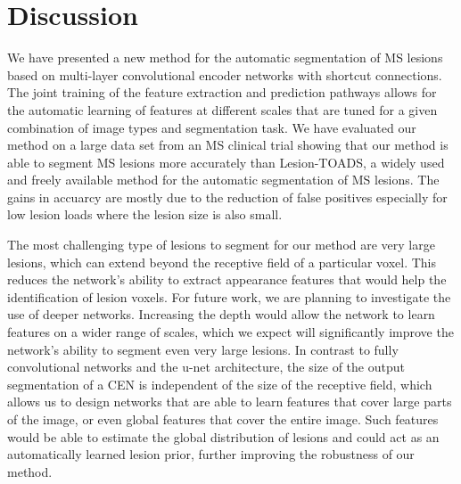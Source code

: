 \section{Discussion}


We have presented a new method for the automatic segmentation of MS lesions
based on multi-layer convolutional encoder networks with shortcut connections.
The joint training of the feature extraction and prediction pathways allows for
the automatic learning of features at different scales that are tuned for a
given combination of image types and segmentation task. We have evaluated our
method on a large data set from an MS clinical trial showing that our method is
able to segment MS lesions more accurately than Lesion-TOADS, a widely used and
freely available method for the automatic segmentation of MS lesions. The gains
in accuarcy are mostly due to the reduction of false positives especially for
low lesion loads where the lesion size is also small.

The most challenging type of lesions to segment for our method are very large
lesions, which can extend beyond the receptive field of a particular voxel. This
reduces the network's ability to extract appearance features that would help
the identification of lesion voxels. For future work, we are planning to
investigate the use of deeper networks. Increasing the depth would allow the
network to learn features on a wider range of scales, which we expect will
significantly improve the network's ability to segment even very large lesions.
In contrast to fully convolutional networks and the u-net architecture, the size
of the output segmentation of a CEN is independent of the size of the receptive
field, which allows us to design networks that are able to learn features that cover
large parts of the image, or even global features that cover the entire image.
Such features would be able to estimate the global distribution of lesions and
could act as an automatically learned lesion prior, further improving the
robustness of our method.


